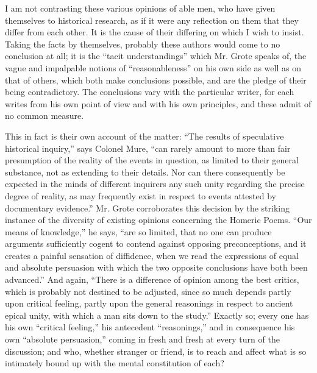 I am not contrasting these various opinions of able men, who have
given themselves to historical research, as if it were any reflection
on them that they differ from each other. It is the cause of their
differing on which I wish to insist. Taking the facts by themselves,
probably these authors would come to no conclusion at all; it is the
``tacit understandings'' which Mr. Grote speaks of, the vague
and impalpable notions of ``reasonableness'' on his own side
as well as on that of others, which both make conclusions possible,
and are the pledge of their being contradictory. The conclusions vary
with the particular writer, for each writes from his own point of view
and with his own principles, and these admit of no common measure.

This in fact is their own account of the matter: ``The results
of speculative historical inquiry,'' says Colonel Mure,
``can rarely amount to more than fair presumption of the reality
of the events in question, as limited to their general substance, not
as extending to their details. Nor can there consequently be expected
in the minds of different inquirers any such unity regarding the
precise degree of reality, as may frequently exist in respect to
events attested by documentary evidence.'' Mr. Grote corroborates
this decision by the striking instance of the diversity of existing
opinions concerning the Homeric Poems. ``Our means of
knowledge,'' he says, ``are so limited, that no one can
produce arguments sufficiently cogent to contend against opposing
preconceptions, and it creates a painful sensation of diffidence, when
we read the expressions of equal and absolute persuasion with which
the two opposite conclusions have both been advanced.'' And again,
``There is a difference of opinion among the best critics, which
is probably not destined to be adjusted, since so much depends partly
upon critical feeling, partly upon the general reasonings in respect
to ancient epical unity, with which a man sits down to the
study.'' Exactly so; every one has his own ``critical
feeling,'' his antecedent ``reasonings,'' and in
consequence his own ``absolute persuasion,'' coming in fresh
and fresh at every turn of the discussion; and who, whether stranger
or friend, is to reach and affect what is so intimately bound up with
the mental constitution of each?

